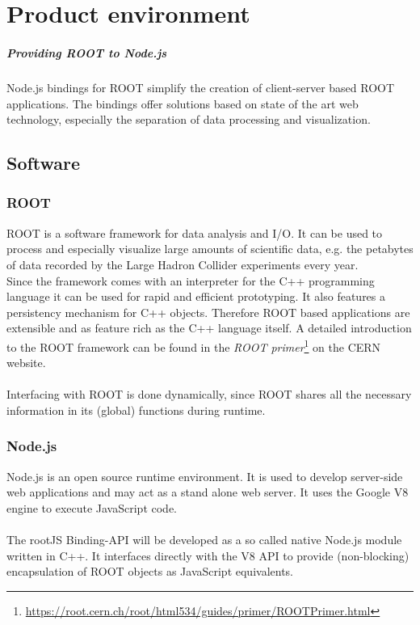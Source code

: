 \chapter{Product environment}

\paragraph{Providing ROOT to Node.js}
\noindent Node.js bindings for ROOT simplify the creation of client-server based ROOT applications. The bindings offer solutions based on state of the art web technology, especially the separation of data processing and visualization.\\

\section{Software}
\subsection{ROOT}

ROOT is a software framework for data analysis and I/O. It can be used to process and especially visualize large amounts of scientific data, e.g. the petabytes of data recorded by the Large Hadron Collider experiments every year.\\
Since the framework comes with an interpreter for the C++ programming language it can be used for rapid and efficient prototyping. It also features a persistency mechanism for C++ objects. Therefore ROOT based applications are extensible and as feature rich as the C++ language itself.
A detailed introduction to the ROOT framework can be found in the \textit{ROOT  primer}\footnote[1]{\url{https://root.cern.ch/root/html534/guides/primer/ROOTPrimer.html}}
on the CERN website. \\ \\
Interfacing with ROOT is done dynamically, since ROOT shares all the necessary information in its (global) functions during runtime.

\subsection{Node.js}

Node.js is an open source runtime environment. It is used to develop server-side web applications and may act as a stand alone web server. It uses the Google V8 engine to execute JavaScript code. \\ \\
The rootJS Binding-API will be developed as a so called native Node.js module written in C++. It interfaces directly with the V8 API to provide (non-blocking) encapsulation of ROOT objects as JavaScript equivalents.

